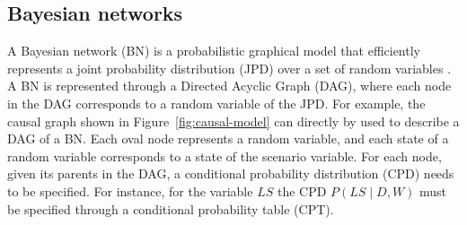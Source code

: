 \documentclass[conference]{IEEEtran}
\begin{document}
\subsection{Bayesian networks}\label{sub:bayesian-networks}


A Bayesian network (BN) is a probabilistic graphical model that efficiently represents a joint probability distribution (JPD) over a set of random variables \cite{jensen01book,pearl88book}. A BN is represented through a Directed Acyclic Graph (DAG), where each node in the DAG corresponds to a random variable of the JPD. For example, the causal graph shown in Figure~\ref{fig:causal-model} can directly by used to describe a DAG of a BN. Each oval node represents a random variable, and each state of a random variable corresponds to a state of the scenario variable. For each node, given its parents in the DAG, a conditional probability distribution (CPD) needs to be specified. For instance, for the variable $LS$ the CPD $P(LS\mid D,W)$ must be specified through a conditional probability table (CPT). 

\end{document}
